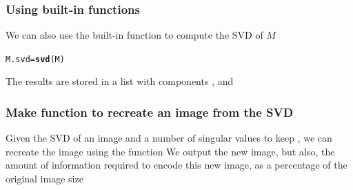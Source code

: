 \documentclass[aspectratio=169]{beamer}\usepackage[]{graphicx}\usepackage[]{xcolor}
\makeatletter
\newcommand{\hldef}[1]{\textcolor[rgb]{0.345,0.345,0.345}{#1}}%
\newcommand{\hlkwb}[1]{\textcolor[rgb]{0.69,0.353,0.396}{#1}}%
\newcommand{\hlkwd}[1]{\textcolor[rgb]{0.737,0.353,0.396}{\textbf{#1}}}%
\newenvironment{kframe}{%
 \def\at@end@of@kframe{}%
 \ifinner\ifhmode%
  \def\at@end@of@kframe{\end{minipage}}%
  \begin{minipage}{\columnwidth}%
 \fi\fi%
 \def\FrameCommand##1{\hskip\@totalleftmargin \hskip-\fboxsep
 \colorbox{shadecolor}{##1}\hskip-\fboxsep
     \hskip-\linewidth \hskip-\@totalleftmargin \hskip\columnwidth}%
 \MakeFramed {\advance\hsize-\width
   \@totalleftmargin\z@ \linewidth\hsize
   \@setminipage}}%
 {\par\unskip\endMakeFramed%
 \at@end@of@kframe}
\newenvironment{knitrout}{}{} %
\makeatother
\begin{document}
\begin{frame}[fragile]\frametitle{Using built-in functions}
We can also use the built-in function  to compute the SVD of $M$
\vfill
\begin{knitrout}
\color{fgcolor}\begin{kframe}
\begin{alltt}
\hldef{M.svd} \hlkwb{=} \hlkwd{svd}\hldef{(M)}
\end{alltt}
\end{kframe}
\end{knitrout}
\vfill
The results are stored in a list with components ,  and 
\end{frame}

\begin{frame}\frametitle{Make function to recreate an image from the SVD}
Given the SVD  of an image and a number of singular values to keep , we can recreate the image using the function 
\vfill
We output the new image, but also, the amount of information required to encode this new image, as a percentage of the original image size
\end{frame}
\end{document}
